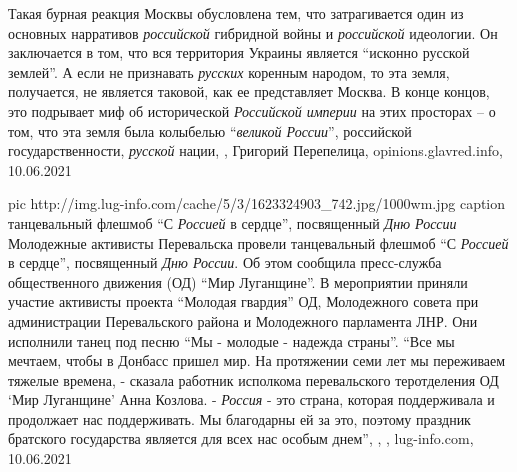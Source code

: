 Такая бурная реакция Москвы обусловлена тем, что затрагивается один из основных
нарративов \emph{российской} гибридной войны и \emph{российской} идеологии. Он заключается в
том, что вся территория Украины является \enquote{исконно русской землей}. А если не
признавать \emph{русских} коренным народом, то эта земля, получается, не является
таковой, как ее представляет Москва. В конце концов, это подрывает миф об
исторической \emph{Российской империи} на этих просторах – о том, что эта земля была
колыбелью \enquote{\emph{великой России}}, российской государственности, \emph{русской} нации,
, 
Григорий Перепелица, opinions.glavred.info, 10.06.2021

\ifcmt
  pic http://img.lug-info.com/cache/5/3/1623324903_742.jpg/1000wm.jpg
	caption танцевальный флешмоб \enquote{С \emph{Россией} в сердце}, посвященный \emph{Дню России}
\fi
Молодежные активисты Перевальска провели танцевальный флешмоб \enquote{С
\emph{Россией} в сердце}, посвященный \emph{Дню России}. Об этом сообщила
пресс-служба общественного движения (ОД) \enquote{Мир Луганщине}.  В
мероприятии приняли участие активисты проекта \enquote{Молодая гвардия} ОД,
Молодежного совета при администрации Перевальского района и Молодежного
парламента ЛНР. Они исполнили танец под песню \enquote{Мы - молодые - надежда
страны}.  \enquote{Все мы мечтаем, чтобы в Донбасс пришел мир. На протяжении
семи лет мы переживаем тяжелые времена, - сказала работник исполкома
перевальского теротделения ОД \enquote{Мир Луганщине} Анна Козлова. -
\emph{Россия} - это страна, которая поддерживала и продолжает нас поддерживать.
Мы благодарны ей за это, поэтому праздник братского государства является для
всех нас особым днем},
, 
, lug-info.com, 10.06.2021

